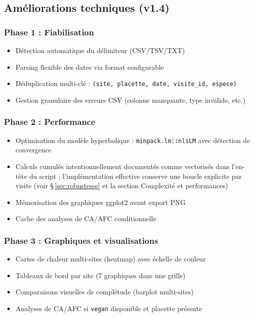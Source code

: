 \documentclass[11pt,a4paper]{article}
\begin{document}
\subsection{Améliorations techniques (v1.4)}
\subsubsection{Phase 1 : Fiabilisation}
\begin{itemize}
  \item D\'etection automatique du d\'elimiteur (CSV/TSV/TXT)
  \item Parsing flexible des dates via format configurable
  \item D\'eduplication multi-cl\'e : \texttt{(site, placette, date, visite\_id, espece)}
  \item Gestion granulaire des erreurs CSV (colonne manquante, type invalide, etc.)
\end{itemize}

\subsubsection{Phase 2 : Performance}
\begin{itemize}
  \item Optimisation du modèle hyperbolique : \texttt{minpack.lm::nlsLM} avec détection de convergence
  \item Calculs cumulés intentionnellement documentés comme \og{}vectorisés\fg{} dans l'en-tête du script ; l'implémentation effective conserve une boucle explicite par visite (voir \S\,\ref{sec:robustesse} et la section Complexité et performances)
  \item M\'emorisation des graphiques ggplot2 avant export PNG
  \item Cache des analyses de CA/AFC conditionnelle
\end{itemize}

\subsubsection{Phase 3 : Graphiques et visualisations}
\begin{itemize}
  \item Cartes de chaleur multi-sites (heatmap) avec échelle de couleur
  \item Tableaux de bord par site (7 graphiques dans une grille)
  \item Comparaisons visuelles de complétude (barplot multi-sites)
  \item Analyses de CA/AFC si \texttt{vegan} disponible et placette présente
\end{itemize}
\end{document}
